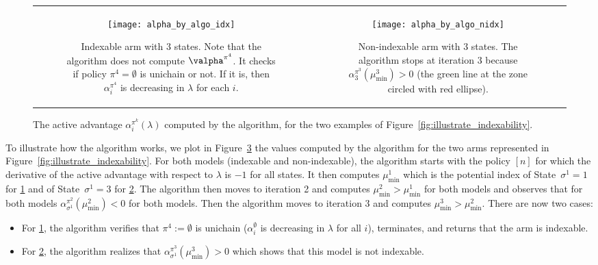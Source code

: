 \begin{figure}[ht]
    \begin{tabular}{cc}
        \begin{subfigure}[t]{0.48\linewidth}
            \texttt{[image: alpha\_by\_algo\_idx]}
            \caption{Indexable arm with $3$ states. Note that the algorithm does not compute $\valpha^{\pi^4}$. It checks if policy $\pi^4=\emptyset$ is unichain or not. If it is, then $\alpha^{\pi^4}_i$ is decreasing in $\lambda$ for each $i$.}
            \label{fig:illustrate_algo_ind}
        \end{subfigure}
        &\begin{subfigure}[t]{0.48\linewidth}
            \texttt{[image: alpha\_by\_algo\_nidx]}
            \caption{Non-indexable arm with $3$ states. The algorithm stops at iteration $3$ because $\alpha^{\pi^3}_3(\mu^3_{\min})>0$ (the green line at the zone circled with red ellipse).}
            \label{fig:illustrate_algo_nind}
        \end{subfigure}            
    \end{tabular}
    \caption{
        The active advantage $\alpha^{\pi^k}_i(\lambda)$ computed by the algorithm, for the two examples of Figure~\ref{fig:illustrate_indexability}.
    }
    \label{fig:illustrate_algo}
\end{figure}

\medskip

To illustrate how the algorithm works, we plot in Figure~\ref{fig:illustrate_algo} the values computed by the algorithm for the two arms represented in Figure~\ref{fig:illustrate_indexability}. For both models (indexable and non-indexable), the algorithm starts with the policy $[n]$ for which the derivative of the active advantage with respect to $\lambda$ is $-1$ for all states. It then computes $\mu^1_{\min}$ which is the potential index of State~$\sigma^1=1$ for \ref{fig:illustrate_algo_ind} and of State~$\sigma^1=3$ for \ref{fig:illustrate_algo_nind}. The algorithm then moves to iteration 2 and computes $\mu^2_{\min}>\mu^1_{\min}$ for both models and observes that for both models $\alpha^{\pi^2}_{\sigma^1}(\mu^2_{\min})<0$ for both models. Then the algorithm moves to iteration $3$ and computes $\mu^3_{\min}>\mu^2_{\min}$. There are now two cases: 
\begin{itemize}
    \item For \ref{fig:illustrate_algo_ind}, the algorithm verifies that $\pi^4:=\emptyset$ is unichain ($\alpha^{\emptyset}_i$ is decreasing in $\lambda$ for all $i$), terminates, and returns that the arm is indexable.
    \item For \ref{fig:illustrate_algo_nind}, the algorithm realizes that $\alpha^{\pi^3}_{\sigma^1}(\mu^3_{\min})>0$ which shows that this model is not indexable. 
\end{itemize}

